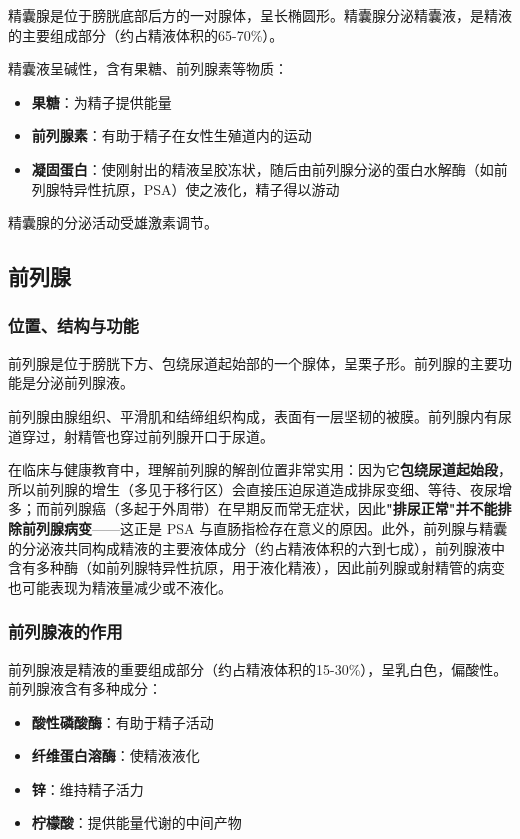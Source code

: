 \documentclass[12pt,a4paper,twoside]{ctexbook}
\begin{document}
精囊腺是位于膀胱底部后方的一对腺体，呈长椭圆形。精囊腺分泌精囊液，是精液的主要组成部分（约占精液体积的65-70\%）。

精囊液呈碱性，含有果糖、前列腺素等物质：
\begin{itemize}
    \item \textbf{果糖}：为精子提供能量
    \item \textbf{前列腺素}：有助于精子在女性生殖道内的运动
    \item \textbf{凝固蛋白}：使刚射出的精液呈胶冻状，随后由前列腺分泌的蛋白水解酶（如前列腺特异性抗原，PSA）使之液化，精子得以游动
\end{itemize}

精囊腺的分泌活动受雄激素调节。

\subsection{前列腺}
\subsubsection{位置、结构与功能}

前列腺是位于膀胱下方、包绕尿道起始部的一个腺体，呈栗子形。前列腺的主要功能是分泌前列腺液。

前列腺由腺组织、平滑肌和结缔组织构成，表面有一层坚韧的被膜。前列腺内有尿道穿过，射精管也穿过前列腺开口于尿道。


在临床与健康教育中，理解前列腺的解剖位置非常实用：因为它\textbf{包绕尿道起始段}，所以前列腺的增生（多见于移行区）会直接压迫尿道造成排尿变细、等待、夜尿增多；而前列腺癌（多起于外周带）在早期反而常无症状，因此\textbf{"排尿正常"并不能排除前列腺病变}——这正是 PSA 与直肠指检存在意义的原因。此外，前列腺与精囊的分泌液共同构成精液的主要液体成分（约占精液体积的六到七成），前列腺液中含有多种酶（如前列腺特异性抗原，用于液化精液），因此前列腺或射精管的病变也可能表现为精液量减少或不液化。

\subsubsection{前列腺液的作用}

前列腺液是精液的重要组成部分（约占精液体积的15-30\%），呈乳白色，偏酸性。前列腺液含有多种成分：
\begin{itemize}
    \item \textbf{酸性磷酸酶}：有助于精子活动
    \item \textbf{纤维蛋白溶酶}：使精液液化
    \item \textbf{锌}：维持精子活力
    \item \textbf{柠檬酸}：提供能量代谢的中间产物
\end{itemize}
\end{document}
